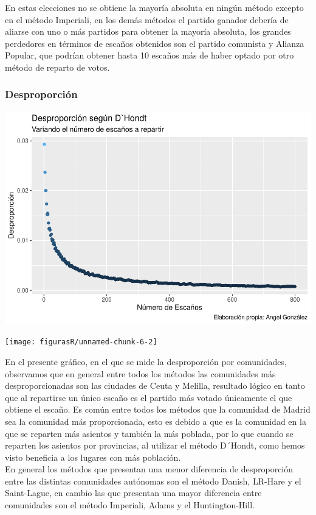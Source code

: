 \documentclass[12pt,a4paper,]{book}
\numberwithin{dummy}{section}
\theoremstyle{ocrenumbox}
\theoremstyle{blacknumex}
\theoremstyle{blacknumbox}
\theoremstyle{ocrenum}
\theoremstyle{ocrenum}
\begin{document}
En estas elecciones no se obtiene la mayoría absoluta en ningún método
excepto en el método Imperiali, en los demás métodos el partido ganador
debería de aliarse con uno o más partidos para obtener la mayoría
absoluta, los grandes perdedores en términos de escaños obtenidos son el
partido comunista y Alianza Popular, que podrían obtener hasta 10
escaños más de haber optado por otro método de reparto de votos.

\hypertarget{desproporciuxf3n}{%
\subsubsection{Desproporción}\label{desproporciuxf3n}}

\begin{center}\includegraphics[width=1\linewidth]{figurasR/unnamed-chunk-6-1} \end{center}

\begin{center}\texttt{[image: figurasR/unnamed-chunk-6-2]} \end{center}

En el presente gráfico, en el que se mide la desproporción por
comunidades, observamos que en general entre todos los métodos las
comunidades más desproporcionadas son las ciudades de Ceuta y Melilla,
resultado lógico en tanto que al repartirse un único escaño es el
partido más votado únicamente el que obtiene el escaño. Es común entre
todos los métodos que la comunidad de Madrid sea la comunidad más
proporcionada, esto es debido a que es la comunidad en la que se
reparten más asientos y también la más poblada, por lo que cuando se
reparten los asientos por provincias, al utilizar el método D´Hondt,
como hemos visto beneficia a los lugares con más población.\\
En general los métodos que presentan una menor diferencia de
desproporción entre las distintas comunidades autónomas son el método
Danish, LR-Hare y el Saint-Lague, en cambio las que presentan una mayor
diferencia entre comunidades son el método Imperiali, Adams y el
Huntington-Hill.
\end{document}
